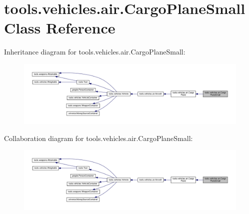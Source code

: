 \hypertarget{classtools_1_1vehicles_1_1air_1_1_cargo_plane_small}{}\section{tools.\+vehicles.\+air.\+Cargo\+Plane\+Small Class Reference}
\label{classtools_1_1vehicles_1_1air_1_1_cargo_plane_small}


Inheritance diagram for tools.\+vehicles.\+air.\+Cargo\+Plane\+Small\+:
\nopagebreak
\begin{figure}[H]
\begin{center}
\leavevmode
\includegraphics[width=350pt]{classtools_1_1vehicles_1_1air_1_1_cargo_plane_small__inherit__graph}
\end{center}
\end{figure}


Collaboration diagram for tools.\+vehicles.\+air.\+Cargo\+Plane\+Small\+:
\nopagebreak
\begin{figure}[H]
\begin{center}
\leavevmode
\includegraphics[width=350pt]{classtools_1_1vehicles_1_1air_1_1_cargo_plane_small__coll__graph}
\end{center}
\end{figure}
